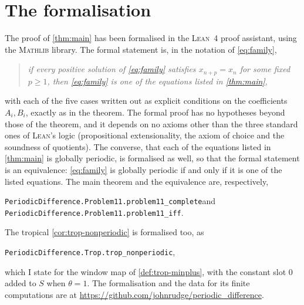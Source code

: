 \section{The formalisation}
\label{app:lean}

The proof of \autoref{thm:main} has been formalised in the \textsc{Lean}~4
proof assistant, using the \textsc{Mathlib} library. The formal statement
is, in the notation of \eqref{eq:family},
\begin{quote}
\emph{if every positive solution of \eqref{eq:family} satisfies
$x_{n+p}=x_n$ for some fixed $p\ge1$, then \eqref{eq:family} is one of the
equations listed in \autoref{thm:main}},
\end{quote}
with each of the five cases written out as explicit conditions on the
coefficients $A_i,B_i$, exactly as in the theorem. The formal proof has no
hypotheses beyond those of the theorem, and it depends on no axioms other
than the three standard ones of \textsc{Lean}'s logic (propositional
extensionality, the axiom of choice and the soundness of quotients).
The converse, that each of the equations listed in \autoref{thm:main} is
globally periodic, is formalised as well, so that the formal statement is an
equivalence: \eqref{eq:family} is globally periodic if and only if it is
one of the listed equations. The main theorem and the equivalence are,
respectively,
\begin{center}
\texttt{PeriodicDifference.Problem11.problem11\_complete}\quad and\quad
\texttt{PeriodicDifference.Problem11.problem11\_iff}.
\end{center}
The tropical \autoref{cor:trop-nonperiodic} is formalised too, as
\begin{center}
\texttt{PeriodicDifference.Trop.trop\_nonperiodic},
\end{center}
which I state for the window map of
\autoref{def:trop-minplus}, with the constant slot $0$ added to $S$ when
$\theta=1$.
The formalisation and the data for its finite computations are at 
\url{https://github.com/johnrudge/periodic_difference}.

